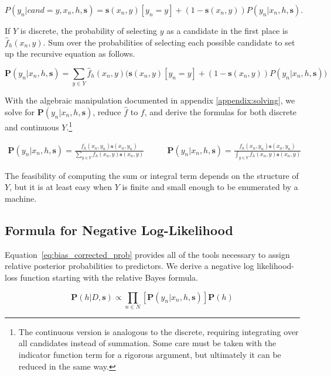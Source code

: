 \documentclass[twoside]{article}
\begin{document}
\[P(y_n|cand=y,x_n,h,\mathbf{s})=\mathbf{s}(x_n,y)\left [y_n = y\right ] + (1-\mathbf{s}(x_n,y))P(y_n|x_n,h,\mathbf{s}).\]

If \(Y\) is discrete, the probability of selecting \(y\) as a candidate in the first place is \(\hat{f}_h(x_n, y)\). Sum over the probabilities of selecting each possible candidate to set up the recursive equation as follows.

\begin{equation}
\label{eq:bias_corrected_setup}
\mathbf{P}(y_n|x_n,h,\mathbf{s})=\sum_{y \in Y}\hat{f}_h(x_n,y)\big(\mathbf{s}(x_n,y)\left [y_n = y\right ] + (1-\mathbf{s}(x_n,y))P(y_n|x_n,h,\mathbf{s})\big)
\end{equation}

With the algebraic manipulation documented in appendix \ref{appendix:solving}, we solve for \(\mathbf{P}(y_n|x_n,h,\mathbf{s})\), reduce \(\hat{f}\) to \(f\), and derive the formulas for both discrete and continuous \(Y\).\footnote{The continuous version is analogous to the discrete, requiring integrating over all candidates instead of summation. Some care must be taken with the indicator function term for a rigorous argument, but ultimately it can be reduced in the same way.}

\begin{align}
\label{eq:bias_corrected_prob}
\mathbf{P}(y_n|x_n,h,\mathbf{s})=\frac{f_h(x_n,y_n)\mathbf{s}(x_n,y_n)}{\sum_{y \in Y}f_h(x_n,y)\mathbf{s}(x_n,y)} &
\qquad\mathbf{P}(y_n|x_n,h,\mathbf{s})=\frac{f_h(x_n,y_n)\mathbf{s}(x_n,y_n)}{\int_{y \in Y}f_h(x_n,y)\mathbf{s}(x_n,y)}
\end{align}

The feasibility of computing the sum or integral term depends on the structure of \(Y\), but it is at least easy when \(Y\) is finite and small enough to be enumerated by a machine.

\subsection{Formula for Negative Log-Likelihood}

Equation~\eqref{eq:bias_corrected_prob} provides all of the tools necessary to assign relative posterior probabilities to predictors. We derive a negative log likelihood-loss function starting with the relative Bayes formula.

\[\mathbf{P}(h|D,\mathbf{s})\propto\prod_{n \in N} \left[\mathbf{P}(y_n|x_n,h,\mathbf{s})\right]\mathbf{P}(h)\]
\end{document}
